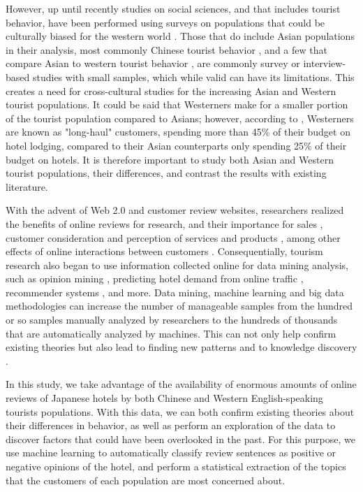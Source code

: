However, up until recently studies on social sciences, and that includes tourist behavior, have been performed using surveys on populations that could be culturally biased for the western world \cite[][]{nielsen2017, jones2010WEIRD, guaratne2009, hogan1978biases}. Those that do include Asian populations in their analysis, most commonly Chinese tourist behavior \cite[e.g.][]{liu2019, chang2010, dongyang2015}, and a few that compare Asian to western tourist behavior \cite[e.g.][]{choi2000}, are commonly survey or interview-based studies with small samples, which while valid can have its limitations. This creates a need for cross-cultural studies for the increasing Asian and Western tourist populations. It could be said that Westerners make for a smaller portion of the tourist population compared to Asians; however, according to \cite{choi2000}, Westerners are known as "long-haul" customers, spending more than 45\% of their budget on hotel lodging, compared to their Asian counterparts only spending 25\% of their budget on hotels. It is therefore important to study both Asian and Western tourist populations, their differences, and contrast the results with existing literature. 

With the advent of Web 2.0 and customer review websites, researchers realized the benefits of online reviews for research, and their importance for sales  \cite[][]{ye2009, basuroy2003}, customer consideration \cite[][]{vermeulen2009} and perception of services and products \cite[][]{browning2013}, among other effects of online interactions between customers \cite[e.g.][]{xiang2010, ren2019}. Consequentially, tourism research also began to use information collected online for data mining analysis, such as opinion mining \cite[e.g.][]{hu2017436}, predicting hotel demand from online traffic \cite[][]{yang2014}, recommender systems \cite[e.g.][]{loh2003}, and more. Data mining, machine learning and big data methodologies can increase the number of manageable samples from the hundred or so samples manually analyzed by researchers to the hundreds of thousands that are automatically analyzed by machines. This can not only help confirm existing theories but also lead to finding new patterns and to knowledge discovery \cite[][]{fayyad1996data}. 

In this study, we take advantage of the availability of enormous amounts of online reviews of Japanese hotels by both Chinese and Western English-speaking tourists populations. With this data, we can both confirm existing theories about their differences in behavior, as well as perform an exploration of the data to discover factors that could have been overlooked in the past. For this purpose, we use machine learning to automatically classify review sentences as positive or negative opinions of the hotel, and perform a statistical extraction of the topics that the customers of each population are most concerned about.


